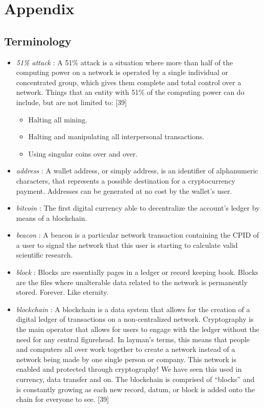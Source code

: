 \section{Appendix}

\subsection{Terminology}

\begin{itemize}
  \item \textit{51\% attack} : A 51\% attack is a situation where more than half of the computing power on a network is operated by a single individual or concentrated group, which   gives them complete and total control over a network. Things that an entity with 51\% of the computing power can do include, but are not limited to: [39]\\
  \begin{itemize}
	\item Halting all mining.
	\item Halting and manipulating all interpersonal transactions.
	\item Using singular coins over and over.
  \end{itemize}
  \item \textit{address} : A wallet address, or simply address, is an identifier of alphanumeric characters, that represents a possible destination for a cryptocurrency payment. Addresses can be generated at no cost by the wallet's user. 
  \item \textit{bitcoin} : The first digital currency able to decentralize the account's ledger by means of a blockchain. 
  \item \textit{beacon} : A beacon is a particular network transaction containing the CPID of a user to signal the network that this user is starting to calculate valid scientific research.
  \item \textit{block} : Blocks are essentially pages in a ledger or record keeping book. Blocks are the files where unalterable data related to the network is permanently stored. Forever. Like eternity.
  \item \textit{blockchain} : A blockchain is a data system that allows for the creation of a digital ledger of transactions on a non-centralized network. Cryptography is the main operator that allows for users to engage with the ledger without the need for any central figurehead. In layman’s terms, this means that people and computers all over work together to create a network instead of a network being made by one single person or company. This network is enabled and protected through cryptography! We have seen this used in currency, data transfer and on. The blockchain is comprised of “blocks” and is constantly growing as each new record, datum, or block is added onto the chain for everyone to see. [39]

\end{itemize}
